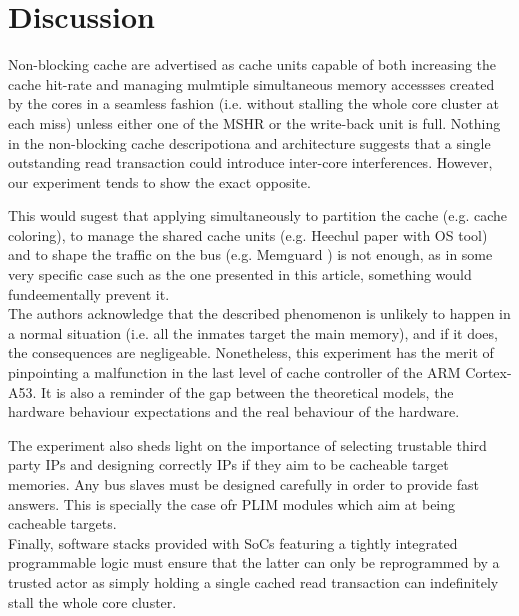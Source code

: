 \section{Discussion}
    Non-blocking cache are advertised as cache units capable of both increasing the cache hit-rate and managing mulmtiple simultaneous memory accessses created by the cores in a seamless fashion (i.e. without stalling the whole core cluster at each miss) unless either one of the MSHR or the write-back unit  is full. Nothing in the non-blocking cache descripotiona and architecture suggests that a single outstanding read transaction could introduce inter-core interferences. However, our experiment tends to show the exact opposite.

    This would sugest that applying simultaneously to partition the cache (e.g. cache coloring), to manage the shared cache units (e.g. Heechul paper with OS tool\cite{}) and to shape the traffic on the bus (e.g. Memguard \cite{}) is not enough, as in some very specific case such as the one presented in this article, something would fundeementally prevent it.\\

    The authors acknowledge that the described phenomenon is unlikely to happen in a normal situation (i.e. all the inmates target the main memory), and if it does, the consequences are negligeable. Nonetheless, this experiment has the merit of pinpointing a malfunction in the last level of cache controller of the ARM Cortex-A53. It is also a reminder of the gap between the theoretical models, the hardware behaviour expectations and the real behaviour of the hardware.

     The experiment also sheds light on the importance of selecting trustable third party IPs and designing correctly IPs if they aim to be cacheable target memories. Any bus slaves must be designed carefully in order to provide fast answers. This is specially the case ofr PLIM modules which aim at being cacheable targets.\\

     Finally, software stacks provided with SoCs featuring a tightly integrated programmable logic must ensure that the latter can only be reprogrammed by a trusted actor as simply holding a single cached read transaction can indefinitely stall the whole core cluster.
